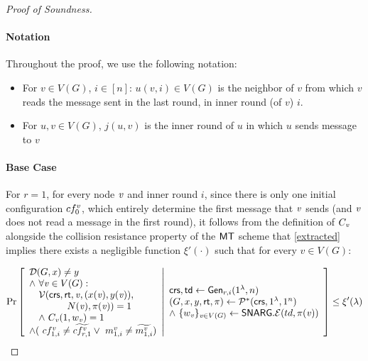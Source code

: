 \begin{proof}[Proof of Soundness]
\paragraph{Notation} Throughout the proof, we use the following notation:
\begin{itemize}
    \item For $v\in V(G)$, $i\in [n]$: $u(v,i)\in V(G)$ is the neighbor of $v$ from which $v$ reads the message sent in the last round, in inner round (of $v$) $i$.
    \item For $u,v\in V(G)$, $j(u,v)$ is the inner round of $u$ in which $u$ sends message to $v$
\end{itemize}



\paragraph{Base Case} 
For $r=1$, for every node $\mathit{ v }$ and inner round $i$, since there is only one initial configuration $cf^{\mathit{ v }}_0$, which entirely determine the first message that $\mathit{ v }$ sends (and $\mathit{ v }$ does not read a message in the first round), it follows from the definition of $C_{\mathit{ v }}$ alongside the collision resistance property of the $\mathsf{MT}$ scheme  that \cref{extracted} implies there exists a negligible function $\xi'(\cdot)$ such that for every $v\in V(G)$:

\begin{gather*}
    \Pr \left[ \begin{array}{ll} 
    \mathcal{D}(G, x)\neq y \\
    \wedge\ \forall \mathit{ v }\in V(G) : \\
    \quad 
        \mathcal{V}(\mathsf{crs}, \mathsf{rt}, \mathit{ v }, (x(\mathit{ v }), y(\mathit{ v })),\\
        \qquad \qquad N(\mathit{ v }), \pi(\mathit{ v })) = 1 \\
        \quad \wedge ~ C_{\mathit{ v }}(1, w_{\mathit{ v }}) = 1 \\
    \wedge (~cf^v_{1,i} \neq \widetilde{cf^v_{r,1}} 
    \vee ~m^v_{1,i} \neq \widetilde{m^v_{1,i}} )
     \end{array} \middle\vert \begin{array}{ll} 
    \mathsf{crs}, \mathsf{td} \leftarrow \mathsf{Gen}_{r,i}(1^\lambda, n) \\
    (G, x, y, \mathsf{rt}, \pi) \leftarrow \mathcal{P}^*(\mathsf{crs}, 1^\lambda, 1^n) \\
    \wedge ~\{w_{\mathit{ v }}\}_{\mathit{ v }\in V(G)}\leftarrow \mathsf{SNARG}.\mathcal{E}(td, \pi(\mathit{ v }))
     \end{array} \right] \leq \xi'(\lambda)
\end{gather*}


\end{proof}
